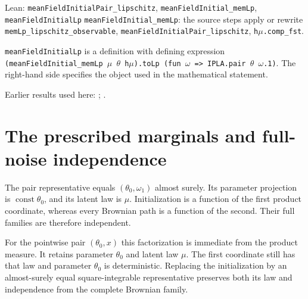 \documentclass[11pt,a4paper]{article}
\begin{document}
\begin{leanbox}{Lean: \texttt{meanFieldInitialPair\_\allowbreak{}lipschitz}, \texttt{meanFieldInitial\_\allowbreak{}memLp}, \texttt{meanFieldInitialLp}}
\texttt{mean\allowbreak{}Field\allowbreak{}Initial\_\allowbreak{}mem\allowbreak{}Lp}: the source steps apply or rewrite \texttt{mem\allowbreak{}Lp\_\allowbreak{}lipschitz\_\allowbreak{}observable}, \texttt{mean\allowbreak{}Field\allowbreak{}Initial\allowbreak{}Pair\_\allowbreak{}lipschitz}, \texttt{h\ensuremath{\mu}.\allowbreak{}comp\_\allowbreak{}fst}.



\texttt{mean\allowbreak{}Field\allowbreak{}Initial\allowbreak{}Lp} is a definition with defining expression \texttt{(mean\allowbreak{}Field\allowbreak{}Initial\_\allowbreak{}mem\allowbreak{}Lp \ensuremath{\mu} \ensuremath{\theta} h\ensuremath{\mu}).\allowbreak{}to\allowbreak{}Lp (fun \ensuremath{\omega} => IPLA.\allowbreak{}pair \ensuremath{\theta} \ensuremath{\omega}.\allowbreak{}1)}. The right-hand side specifies the object used in the mathematical statement.
\end{leanbox}


Earlier results used here: \cite[Section~3.1.1]{LangevinLean2026IPLA}; \cite[Section~3.3.1]{LangevinLean2026IPLA}.

\section{\texorpdfstring{The prescribed marginals and full-noise independence}{The prescribed marginals and full-noise independence}}


The pair representative equals \((\theta_0,\omega_1)\) almost surely. Its parameter projection is \(\operatorname{const}\theta_0\), and its latent law is \(\mu\). Initialization is a function of the first product coordinate, whereas every Brownian path is a function of the second. Their full families are therefore independent.



For the pointwise pair \((\theta_0,x)\) this factorization is immediate from the product measure. It retains parameter \(\theta_0\) and latent law \(\mu\). The first coordinate still has that law and parameter \(\theta_0\) is deterministic. Replacing the initialization by an almost-surely equal square-integrable representative preserves both its law and independence from the complete Brownian family.
\end{document}
